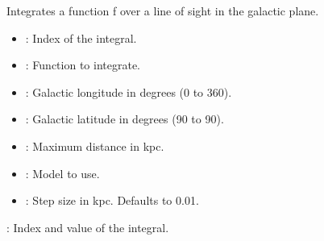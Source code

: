 \documentclass[letterpaper,10pt,english]{sphinxmanual}
\begin{document}
\begin{fulllineitems}
\begin{fulllineitems}
\label{\detokenize{ModelHelper:ModelHelper.ModelHelper.integ_d_async}}
\pysigstartsignatures
{}
\pysigstopsignatures
\sphinxAtStartPar
Integrates a function f over a line of sight in the galactic plane.
\begin{description}
\begin{itemize}
\item {} 
\sphinxAtStartPar
{}: Index of the integral.

\item {} 
\sphinxAtStartPar
{}: Function to integrate.

\item {} 
\sphinxAtStartPar
{}: Galactic longitude in degrees (0 to 360).

\item {} 
\sphinxAtStartPar
{}: Galactic latitude in degrees (\sphinxhyphen{}90 to 90).

\item {} 
\sphinxAtStartPar
{}: Maximum distance in kpc.

\item {} 
\sphinxAtStartPar
{}: Model to use.

\item {} 
\sphinxAtStartPar
{}: Step size in kpc. Defaults to 0.01.

\end{itemize}

\sphinxAtStartPar
{}: Index and value of the integral.

\end{description}

\end{fulllineitems}


\end{fulllineitems}
\end{document}
